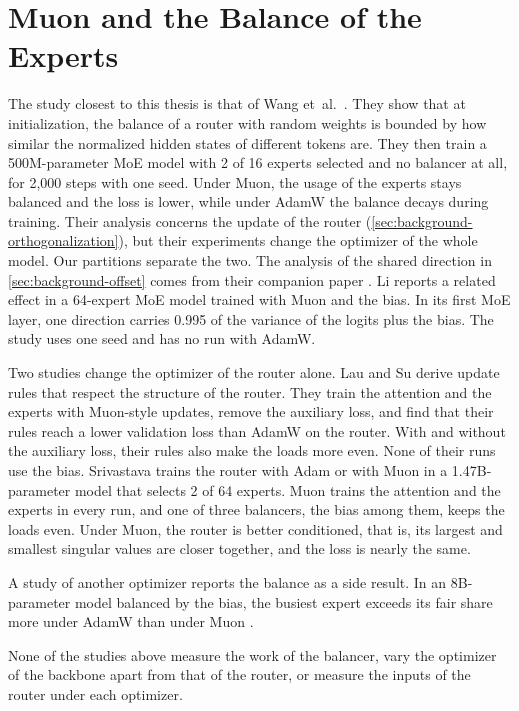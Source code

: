 \section{Muon and the Balance of the Experts}
\label{sec:related-muon-balance}
The study closest to this thesis is that of Wang et~al.~\cite{wang2026depth}. They show that at initialization, the balance of a router with random weights is bounded by how similar the normalized hidden states of different tokens are. They then train a 500M-parameter MoE model with 2 of 16 experts selected and no balancer at all, for 2,000 steps with one seed. Under Muon, the usage of the experts stays balanced and the loss is lower, while under AdamW the balance decays during training. Their analysis concerns the update of the router (\cref{sec:background-orthogonalization}), but their experiments change the optimizer of the whole model. Our partitions separate the two. The analysis of the shared direction in \cref{sec:background-offset} comes from their companion paper \cite{wang2026myth}. Li \cite{li2026spectralcap} reports a related effect in a 64-expert MoE model trained with Muon and the bias. In its first MoE layer, one direction carries 0.995 of the variance of the logits plus the bias. The study uses one seed and has no run with AdamW.

Two studies change the optimizer of the router alone. Lau and Su \cite{lau2026symmetry} derive update rules that respect the structure of the router. They train the attention and the experts with Muon-style updates, remove the auxiliary loss, and find that their rules reach a lower validation loss than AdamW on the router. With and without the auxiliary loss, their rules also make the loads more even. None of their runs use the bias. Srivastava \cite{srivastava2026lossfree} trains the router with Adam or with Muon in a 1.47B-parameter model that selects 2 of 64 experts. Muon trains the attention and the experts in every run, and one of three balancers, the bias among them, keeps the loads even. Under Muon, the router is better conditioned, that is, its largest and smallest singular values are closer together, and the loss is nearly the same.

A study of another optimizer reports the balance as a side result. In an 8B-parameter model balanced by the bias, the busiest expert exceeds its fair share more under AdamW than under Muon \cite{xie2026spectralsphere}.

None of the studies above measure the work of the balancer, vary the optimizer of the backbone apart from that of the router, or measure the inputs of the router under each optimizer.

